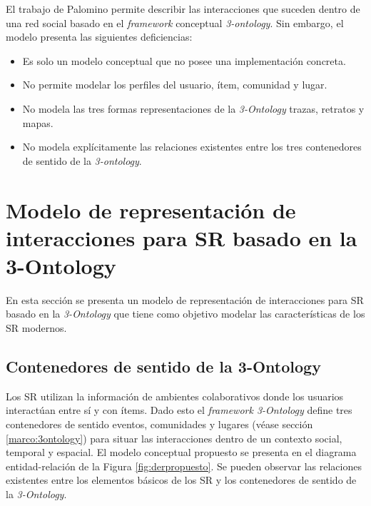 El trabajo de Palomino permite describir las interacciones que suceden dentro de una red social basado en el \textit{framework} conceptual \textit{3-ontology}. Sin embargo, el modelo presenta las siguientes deficiencias: 

\begin{itemize}
	\item Es solo un modelo conceptual que no posee una implementación concreta.
	\item No permite modelar los perfiles del usuario, ítem, comunidad y lugar.
	\item No modela las tres formas representaciones de la \textit{3-Ontology} trazas, retratos y mapas.
	\item No modela explícitamente las relaciones existentes entre los tres contenedores de sentido de la \textit{3-ontology}.
\end{itemize}

\section{Modelo de representación de interacciones para SR basado en la 3-Ontology}

En esta sección se presenta un modelo de representación de interacciones para SR basado en la \textit{3-Ontology} que tiene como objetivo modelar las características de los SR modernos.

\subsection{Contenedores de sentido de la 3-Ontology}

Los SR utilizan la información de ambientes colaborativos donde los usuarios interactúan entre sí y con ítems. Dado esto el \textit{framework 3-Ontology} define tres contenedores de sentido eventos, comunidades y lugares (véase sección \ref{marco:3ontology}) para situar las interacciones dentro de un contexto social, temporal y espacial. El modelo conceptual propuesto se presenta en el diagrama entidad-relación de la Figura \ref{fig:derpropuesto}. Se pueden observar las relaciones existentes entre los elementos básicos de los SR y los contenedores de sentido de la \textit{3-Ontology}.

